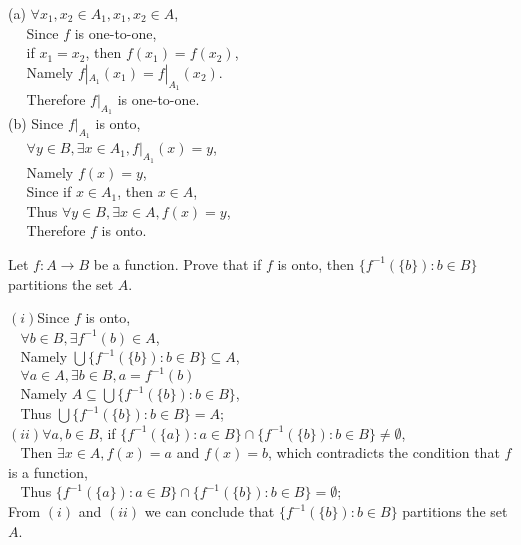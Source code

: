 \documentclass[11pt, a4paper, UTF8]{ctexart}
\begin{document}
\begin{solution}
  (a) $\forall x_{1},x_{2} \in A_{1}, x_{1},x_{2} \in A$,\\
  $~~~~~~$Since $f$ is one-to-one,\\
  $~~~~~~$if $x_{1} = x_{2}$, then $f(x_{1}) = f(x_{2})$,\\
  $~~~~~~$Namely $f|_{A_{1}}(x_{1}) = f|_{A_{1}}(x_{2})$.\\
  $~~~~~~$Therefore $f|_{A_{1}}$ is one-to-one.\\
  (b) Since $f|_{A_{1}}$ is onto,\\
  $~~~~~~\forall y \in B, \exists x \in A_{1}, f|_{A_{1}}(x) = y$,\\
  $~~~~~~$Namely $f(x) = y$,\\
  $~~~~~~$Since if $x \in A_{1}$, then $x \in A$,\\
  $~~~~~~$Thus $\forall y \in B, \exists x \in A, f(x) = y$,\\
  $~~~~~~$Therefore $f$ is onto.
\end{solution}

\begin{problem}[UD: 16.19]
  Let $f:A \rightarrow B$ be a function. Prove that if $f$ is onto, then 
  $\{f^{-1}(\{b\}):b \in B\}$ partitions the set $A$.
\end{problem}

\begin{solution}
  $(i)$Since $f$ is onto,\\
  $~~~~\forall b \in B, \exists f^{-1}(b) \in A$,\\
  $~~~~$Namely $\bigcup \{f^{-1}(\{b\}):b \in B\} \subseteq A$,\\
  $~~~~\forall a \in A, \exists b \in B, a = f^{-1}(b)$\\
  $~~~~$Namely $A \subseteq \bigcup \{f^{-1}(\{b\}):b \in B\}$,\\
  $~~~~$Thus $\bigcup \{f^{-1}(\{b\}):b \in B\} = A$;\\
  $(ii)\forall a,b \in B$, if $\{f^{-1}(\{a\}):a \in B\} \cap \{f^{-1}(\{b\}):b \in B\} 
  \neq \emptyset$,\\
  $~~~~$Then $\exists x \in A, f(x) = a$ and $f(x) = b$, which contradicts 
  the condition that $f$ is a function,\\
  $~~~~$Thus $\{f^{-1}(\{a\}):a \in B\} \cap \{f^{-1}(\{b\}):b \in B\} = \emptyset$;\\
  From $(i)$ and $(ii)$ we can conclude that $\{f^{-1}(\{b\}):b \in B\}$ partitions 
  the set $A$.
\end{solution}
\end{document}
